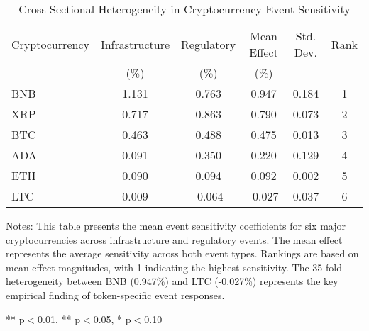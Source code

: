 \begin{table}[htbp]
\centering
\caption{Cross-Sectional Heterogeneity in Cryptocurrency Event Sensitivity}
\label{tab:heterogeneity}
\begin{tabular}{lccccc}
\toprule
Cryptocurrency & Infrastructure & Regulatory & Mean Effect & Std. Dev. & Rank \\
             & (\%) & (\%) & (\%) & & \\
\midrule
BNB & 1.131 & 0.763 & 0.947 & 0.184 & 1 \\
XRP & 0.717 & 0.863 & 0.790 & 0.073 & 2 \\
BTC & 0.463 & 0.488 & 0.475 & 0.013 & 3 \\
ADA & 0.091 & 0.350 & 0.220 & 0.129 & 4 \\
ETH & 0.090 & 0.094 & 0.092 & 0.002 & 5 \\
LTC & 0.009 & -0.064 & -0.027 & 0.037 & 6 \\
\bottomrule
\end{tabular}
\begin{tablenotes}
\small
\item Notes: This table presents the mean event sensitivity coefficients for six major cryptocurrencies across infrastructure and regulatory events. The mean effect represents the average sensitivity across both event types. Rankings are based on mean effect magnitudes, with 1 indicating the highest sensitivity. The 35-fold heterogeneity between BNB (0.947\%) and LTC (-0.027\%) represents the key empirical finding of token-specific event responses.
\item *** p$<$0.01, ** p$<$0.05, * p$<$0.10
\end{tablenotes}
\end{table}
